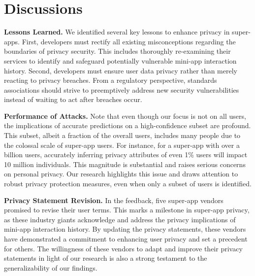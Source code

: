 \section{Discussions}



\noindent \textbf{Lessons Learned. }
We identified several key lessons to enhance privacy in super-apps. First, developers must rectify all existing misconceptions regarding the boundaries of privacy security. This includes thoroughly re-examining their services to identify and safeguard potentially vulnerable mini-app interaction history. Second, developers must ensure user data privacy rather than merely reacting to privacy breaches. From a regulatory perspective, standards associations should strive to preemptively address new security vulnerabilities instead of waiting to act after breaches occur.

\noindent{}

\noindent \textbf{Performance of Attacks.}
Note that even though our focus is not on all users, the implications of accurate predictions on a high-confidence subset are profound. This subset, albeit a fraction of the overall users, includes many people due to the colossal scale of super-app users. For instance, for a super-app with over a billion users, accurately inferring privacy attributes of even 1\% users will impact 10 million individuals. This magnitude is substantial and raises serious concerns on personal privacy. Our research highlights this issue and draws attention to robust privacy protection measures, even when only a subset of users is identified.

\noindent \textbf{Privacy Statement Revision.} In the feedback, five super-app vendors promised to revise their user terms. This marks a milestone in super-app privacy, as these industry giants acknowledge and address the privacy implications of mini-app interaction history. By updating the privacy statements, these vendors have demonstrated a commitment to enhancing user privacy and set a precedent for others. The willingness of these vendors to adapt and improve their privacy statements in light of our research is also a strong testament to the generalizability of our findings.

